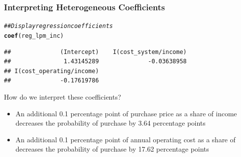 \documentclass{beamer}\usepackage[]{graphicx}\usepackage[]{xcolor}
\makeatletter
\newcommand{\hlstr}[1]{\textcolor[rgb]{0.192,0.494,0.8}{#1}}%
\newcommand{\hlcom}[1]{\textcolor[rgb]{0.678,0.584,0.686}{\textit{#1}}}%
\newcommand{\hlopt}[1]{\textcolor[rgb]{0,0,0}{#1}}%
\newcommand{\hlstd}[1]{\textcolor[rgb]{0.345,0.345,0.345}{#1}}%
\newcommand{\hlkwc}[1]{\textcolor[rgb]{0.333,0.667,0.333}{#1}}%
\newcommand{\hlkwd}[1]{\textcolor[rgb]{0.737,0.353,0.396}{\textbf{#1}}}%
\newenvironment{kframe}{%
 \def\at@end@of@kframe{}%
 \ifinner\ifhmode%
  \def\at@end@of@kframe{\end{minipage}}%
  \begin{minipage}{\columnwidth}%
 \fi\fi%
 \def\FrameCommand##1{\hskip\@totalleftmargin \hskip-\fboxsep
 \colorbox{shadecolor}{##1}\hskip-\fboxsep
     \hskip-\linewidth \hskip-\@totalleftmargin \hskip\columnwidth}%
 \MakeFramed {\advance\hsize-\width
   \@totalleftmargin\z@ \linewidth\hsize
   \@setminipage}}%
 {\par\unskip\endMakeFramed%
 \at@end@of@kframe}
\newenvironment{knitrout}{}{} %
\makeatother
\begin{document}
\begin{frame}[fragile]\frametitle{Interpreting Heterogeneous Coefficients}
\begin{knitrout}\footnotesize
{}\color{fgcolor}\begin{kframe}
\begin{alltt}
\hlcom{## Display regression coefficients}
\hlkwd{coef}\hlstd{(reg_lpm_inc)}
\end{alltt}
\begin{verbatim}
##              (Intercept)    I(cost_system/income) 
##               1.43145289              -0.03638958 
## I(cost_operating/income) 
##              -0.17619786
\end{verbatim}
\end{kframe}
\end{knitrout}
    \vspace{2ex}
    How do we interpret these coefficients?
    \begin{itemize}
        \item An additional 0.1 percentage point of purchase price as a share of income decreases the probability of purchase by 3.64 percentage points
        \item An additional 0.1 percentage point of annual operating cost as a share of decreases the probability of purchase by 17.62 percentage points
    \end{itemize}
\end{frame}

\end{document}
